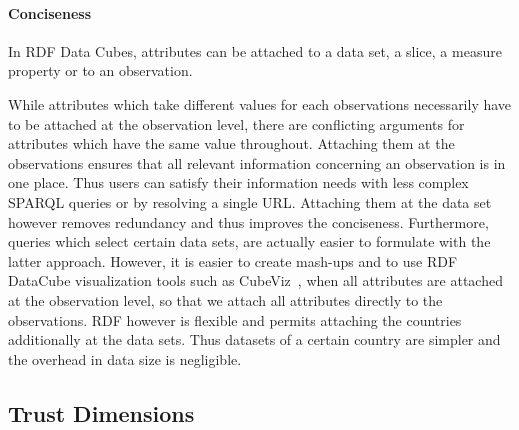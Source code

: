\documentclass[sw]{iosart2x}
\begin{document}
\paragraph{Conciseness}
In RDF Data Cubes, attributes can be attached to a data set, a slice, a measure property or to an observation.

While attributes which take different values for each observations necessarily have to be attached at the observation level, there are conflicting arguments for attributes which have the same value throughout.
Attaching them at the observations ensures that all relevant information concerning an observation is in one place.
Thus users can satisfy their information needs with less complex SPARQL queries or by resolving a single URL.
Attaching them at the data set however removes redundancy and thus improves the conciseness.
Furthermore, queries which select certain data sets, are actually easier to formulate with the latter approach.
However, it is easier to create mash-ups and to use RDF DataCube visualization tools such as CubeViz~\cite{cubeviz}, when all attributes are attached at the observation level, so that we attach all attributes directly to the observations.
RDF however is flexible and permits attaching the countries additionally at the data sets. Thus datasets of a certain country are simpler and the overhead in data size is negligible.



\subsection{Trust Dimensions}
\end{document}
